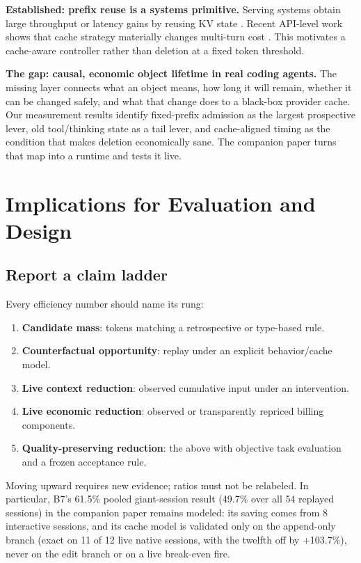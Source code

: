 \documentclass[10pt,twocolumn]{article}
\begin{document}
\textbf{Established: prefix reuse is a systems primitive.}  Serving systems obtain large throughput
or latency gains by reusing KV state \cite{kwon2023pagedattention,zheng2024sglang,gim2024promptcache,
ye2024chunkattention,srivatsa2024preble}.  Recent API-level work shows that cache strategy materially
changes multi-turn cost \cite{lumer2026cache,song2026capc,khailo2026keepalive,xu2026tokenpilot}.  This
motivates a cache-aware controller rather than deletion at a fixed token threshold.

\textbf{The gap: causal, economic object lifetime in real coding agents.}  The missing layer connects
what an object means, how long it will remain, whether it can be changed safely, and what that change
does to a black-box provider cache.  Our measurement results identify fixed-prefix admission as the
largest prospective lever, old tool/thinking state as a tail lever, and cache-aligned timing as the
condition that makes deletion economically sane.  The companion paper turns that map into a runtime
and tests it live.

\section{Implications for Evaluation and Design}

\subsection{Report a claim ladder}

Every efficiency number should name its rung:

\begin{enumerate}
  \item \textbf{Candidate mass}: tokens matching a retrospective or type-based rule.
  \item \textbf{Counterfactual opportunity}: replay under an explicit behavior/cache model.
  \item \textbf{Live context reduction}: observed cumulative input under an intervention.
  \item \textbf{Live economic reduction}: observed or transparently repriced billing components.
  \item \textbf{Quality-preserving reduction}: the above with objective task evaluation and a frozen
  acceptance rule.
\end{enumerate}

Moving upward requires new evidence; ratios must not be relabeled.  In particular, B7's 61.5\%
pooled giant-session result (49.7\% over all 54 replayed sessions) in the companion paper remains modeled: its saving comes from 8
interactive sessions, and its cache model is validated only on the append-only branch (exact on 11 of 12
live native sessions, with the twelfth off by +103.7\%), never on the edit branch or on a live
break-even fire.
\end{document}
